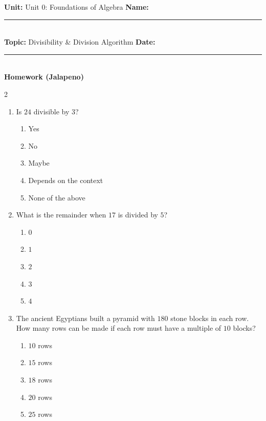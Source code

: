 \documentclass[10pt]{article}
\begin{document}
\enlargethispage{2.5cm}

\begin{tcolorbox}[colback=mainblue!5, colframe=mainblue, sharp corners, boxrule=0.5pt]
    \small \textbf{Unit:} Unit 0: Foundations of Algebra \hfill \textbf{Name:} \rule{3cm}{0.4pt} \\
    \small \textbf{Topic:} Divisibility & Division Algorithm \hfill \textbf{Date:} \rule{2cm}{0.4pt} \\
    \centering \textbf{\large Homework (Jalapeno)}
\end{tcolorbox}

\vspace{0.2cm}

\begin{multicols}{2}
\begin{enumerate}[label=\textbf{Q\arabic*.}, leftmargin=*, itemsep=6pt, parsep=0pt]

  \item \small Is $24$ divisible by $3$?
  \begin{enumerate}[label=(\Alph*), leftmargin=0.6cm, nosep, itemsep=2pt]
    \item Yes
    \item No
    \item Maybe
    \item Depends on the context
    \item None of the above
  \end{enumerate}

  \item \small What is the remainder when $17$ is divided by $5$?
  \begin{enumerate}[label=(\Alph*), leftmargin=0.6cm, nosep, itemsep=2pt]
    \item $0$
    \item $1$
    \item $2$
    \item $3$
    \item $4$
  \end{enumerate}

  \item \small The ancient Egyptians built a pyramid with $180$ stone blocks in each row. How many rows can be made if each row must have a multiple of $10$ blocks?
  \begin{enumerate}[label=(\Alph*), leftmargin=0.6cm, nosep, itemsep=2pt]
    \item $10$ rows
    \item $15$ rows
    \item $18$ rows
    \item $20$ rows
    \item $25$ rows
  \end{enumerate}


\end{enumerate}
\end{multicols}
\end{document}
